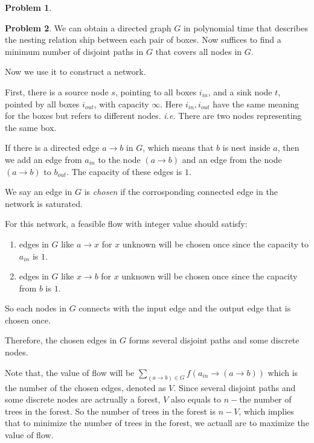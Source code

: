 \documentclass[a4paper]{article}
\theoremstyle{definition}
\newtheorem{problem}{Problem}
\theoremstyle{plain}
\newcommand{\dps}{\displaystyle}
\numberwithin{equation}{problem}
\newcommand{\ie}{ \textit{ i.e. } }
\begin{document}
\begin{problem}
\end{problem}

\begin{problem}
    We can obtain a directed graph  $ G  $ in polynomial time that describes the nesting relation ship between each pair of boxes. Now suffices to find a minimum number of disjoint paths in  $ G $ that covers all nodes in  $ G $. 

    Now we use it to construct a network.

    First, there is a source node  $ s $, pointing to all boxes  $ i_{in} $, and a sink node  $ t $, pointed by all boxes $ i_{out} $, with capacity  $ \infty $. Here  $ i_{in}, i_{out} $ have the same meaning for the boxes but refers to different nodes. \ie There are two nodes representing the same box.

    If there is a directed edge  $ a\rightarrow b $ in  $ G  $, which means that  $ b $ is nest inside  $ a $, then we add an edge from  $ a_{in} $ to the node $ (a\rightarrow b) $ and an edge from the node $ (a\rightarrow b) $ to  $ b_{out} $. The capacity of these edges is  $ 1 $.
    
    We say an edge in  $ G $ is \textit{chosen} if the corrosponding connected edge in the network is saturated. 

    For this network, a feasible flow with integer value should satisfy:
    \begin{enumerate}
        \item edges in  $ G $ like  $ a\rightarrow x $ for  $ x $ unknown will be chosen once since the capacity to  $ a_{in} $ is  $ 1 $.
        \item edges in  $ G $ like  $ x\rightarrow b $ for  $ x $ unknown will be chosen once since the capacity from  $ b $ is  $ 1 $.
    \end{enumerate}

    So each nodes in  $ G $ connects with the input edge and the output edge that is chosen once.
    
    Therefore, the chosen edges in  $ G  $ forms several disjoint paths and some discrete nodes.


    Note that, the value of flow will be  $ \dps\sum_{(a\rightarrow b)\in G}f(a_{in}\to (a\to b)) $ which is the number of the chosen edges, denoted as  $ V $. Since several disjoint paths and some discrete nodes are actrually a forest,  $ V  $ also equals to  $ n- $the number of trees in the forest. So the number of trees in the forest is  $ n-V $, which implies that to minimize the number of trees in the forest, we actuall are to maximize the value of flow.


\end{problem}
\end{document}
